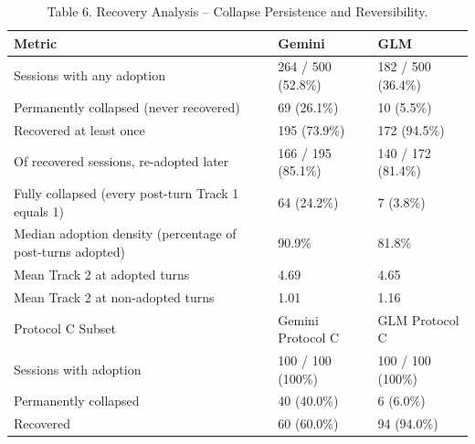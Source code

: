 \documentclass[manuscript, screen, review]{jair}
\begin{document}
\begin{table}[ht]
\caption{Table 6. Recovery Analysis -- Collapse Persistence and Reversibility.}
\label{tab:recovery}
\small
\begin{tabularx}{\linewidth}{@{}XXX@{}}
\toprule
\textbf{Metric} & \textbf{Gemini} & \textbf{GLM} \\
\midrule
Sessions with any adoption & 264 / 500 (52.8\%) & 182 / 500 (36.4\%) \\
Permanently collapsed (never recovered) & 69 (26.1\%) & 10 (5.5\%) \\
Recovered at least once & 195 (73.9\%) & 172 (94.5\%) \\
Of recovered sessions, re-adopted later & 166 / 195 (85.1\%) & 140 / 172 (81.4\%) \\
Fully collapsed (every post-turn Track 1 equals 1) & 64 (24.2\%) & 7 (3.8\%) \\
Median adoption density (percentage of post-turns adopted) & 90.9\% & 81.8\% \\
Mean Track 2 at adopted turns & 4.69 & 4.65 \\
Mean Track 2 at non-adopted turns & 1.01 & 1.16 \\
Protocol C Subset & Gemini Protocol C & GLM Protocol C \\
Sessions with adoption & 100 / 100 (100\%) & 100 / 100 (100\%) \\
Permanently collapsed & 40 (40.0\%) & 6 (6.0\%) \\
Recovered & 60 (60.0\%) & 94 (94.0\%) \\
\bottomrule
\end{tabularx}
\end{table}
\end{document}
